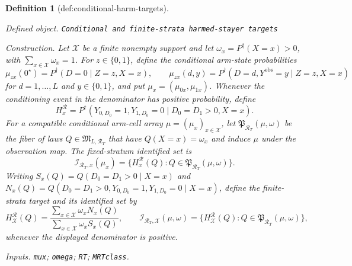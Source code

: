 \documentclass{article}
\newtheorem{definition}{Definition}
\begin{document}
\begin{definition}[def:conditional-harm-targets]\label{def:conditional-harm-targets}
\par\smallskip\noindent\emph{Defined object.} \texttt{Conditional and finite-\allowbreak{}strata harmed-\allowbreak{}stayer targets}
\par\smallskip\noindent\emph{Construction.} Let \(\mathcal X\) be a finite nonempty support and let \(\omega_x=P^{\dagger}(X=x)>0\), with \(\sum_{x\in\mathcal X}\omega_x=1\).  For \(z\in\{0,1\}\), define the conditional arm-state probabilities
\[\mu_{zx}(0^{\star})=P^{\dagger}(D=0\mid Z=z,X=x),\qquad
  \mu_{zx}(d,y)=P^{\dagger}(D=d,Y^{\mathrm{obs}}=y\mid Z=z,X=x)\]
for \(d=1,\ldots,L\) and \(y\in\{0,1\}\), and put \(\mu_x=(\mu_{0x},\mu_{1x})\).  Whenever the conditioning event in the denominator has positive probability, define
\[H_x^{\mathcal R}=P^{\dagger}(Y_{0,D_0}=1,Y_{1,D_0}=0\mid D_0=D_1>0,X=x).\]
For a compatible conditional arm-cell array \(\mu=(\mu_x)_{x\in\mathcal X}\), let \(\mathfrak P_{\mathcal R_T}(\mu,\omega)\) be the fiber of laws \(Q\in\mathfrak M_{L,\mathcal R_T}\) that have \(Q(X=x)=\omega_x\) and induce \(\mu\) under the observation map.  The fixed-stratum identified set is
\[\mathcal I_{\mathcal R_T,x}(\mu_x)=\{H_x^{\mathcal R}(Q):Q\in\mathfrak P_{\mathcal R_T}(\mu,\omega)\}.\]
Writing \(S_x(Q)=Q(D_0=D_1>0\mid X=x)\) and \(N_x(Q)=Q(D_0=D_1>0,Y_{0,D_0}=1,Y_{1,D_0}=0\mid X=x)\), define the finite-strata target and its identified set by
\[H_{\mathcal X}^{\mathcal R}(Q)=\frac{\sum_{x\in\mathcal X}\omega_xN_x(Q)}{\sum_{x\in\mathcal X}\omega_xS_x(Q)},\qquad
  \mathcal I_{\mathcal R_T,\mathcal X}(\mu,\omega)=\{H_{\mathcal X}^{\mathcal R}(Q):Q\in\mathfrak P_{\mathcal R_T}(\mu,\omega)\},\]
whenever the displayed denominator is positive.
\par\smallskip\noindent\emph{Inputs.} \texttt{mux}; \texttt{omega}; \texttt{RT}; \texttt{MRTclass}.
\end{definition}
\end{document}
